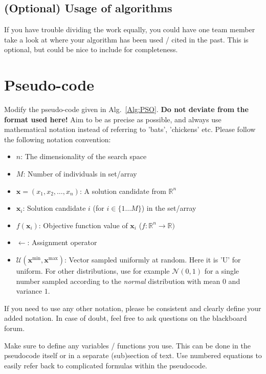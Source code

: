 \documentclass[runningheads]{llncs}
\begin{document}
\subsection{(Optional) Usage of algorithms}
If you have trouble dividing the work equally, you could have one team member take a look at where your algorithm has been used / cited in the past. This is optional, but could be nice to include for completeness. 

\section{Pseudo-code}
Modify the pseudo-code given in Alg.~\ref{Alg:PSO}. \textbf{Do not deviate from the format used here!} Aim to be as precise as possible, and always use mathematical notation instead of referring to 'bats', 'chickens' etc. Please follow the following notation convention:
\begin{itemize}
    \item $n$: The dimensionality of the search space
    \item $M$: Number of individuals in set/array
    \item $\mathbf{x}=(x_1,x_2,\dots,x_n)$: A solution candidate from $\mathds{R}^n$
    \item $\mathbf{x}_i$: Solution candidate $i$ (for $i \in \{1\dots M\}$) in the set/array
    \item $f(\mathbf{x}_i)$: Objective function value of $\mathbf{x}_i$ ($f: \mathds{R}^n \rightarrow \mathds{R})$
    \item $\leftarrow$: Assignment operator
    \item $\bm{\mathcal{U}}(\mathbf{x}^{\text{min}},\mathbf{x}^{\text{max}} )$: Vector sampled uniformly at random. Here it is 'U' for uniform. For other distributions, use for example $\bm{\mathcal{N}}(0,1)$ for a single number sampled according to the \textit{normal} distribution with mean $0$ and variance $1$.
\end{itemize}
If you need to use any other notation, please be consistent and clearly define your added notation. In case of doubt, feel free to ask questions on the blackboard forum. 

Make sure to define any variables / functions you use. This can be done in the pseudocode itself or in a separate (sub)section of text. Use numbered equations to easily refer back to complicated formulas within the pseudocode. 
\end{document}
